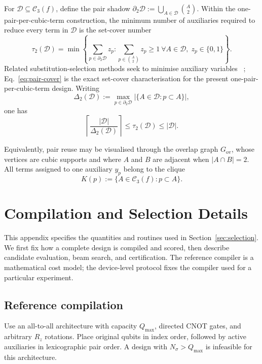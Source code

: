 \documentclass[a4paper,onecolumn,11pt,unpublished]{quantumarticle}
\theoremstyle{remark}
\begin{document}
For $\mathcal D\subseteq\mathcal C_3(f)$, define the pair shadow
\(
\partial_2\mathcal D
:=
\bigcup_{A\in\mathcal D}\binom{A}{2}.
\)
Within the one-pair-per-cubic-term construction, the minimum number of
auxiliaries required to reduce every term in $\mathcal D$ is the set-cover
number
\begin{equation}
\tau_2(\mathcal D)
=
\min
\left\{
\sum_{p\in\partial_2\mathcal D}z_p:
\sum_{p\in\binom{A}{2}}z_p\ge1\ \forall A\in\mathcal D,\;
z_p\in\{0,1\}
\right\}.
\label{eq:pair-cover}
\end{equation}
Related substitution-selection methods seek to minimise auxiliary variables
~\cite{VermaLewis2020,VermaLewisKochenberger2021,Schmidbauer2026};
Eq.~\eqref{eq:pair-cover} is the exact set-cover characterisation for the
present one-pair-per-cubic-term design.
Writing
\[
\Delta_2(\mathcal D)
:=
\max_{p\in\partial_2\mathcal D}
|\{A\in\mathcal D:p\subset A\}|,
\]
one has
\[
\left\lceil
\frac{|\mathcal D|}{\Delta_2(\mathcal D)}
\right\rceil
\le
\tau_2(\mathcal D)
\le
|\mathcal D|.
\]

Equivalently, pair reuse may be visualised through the overlap graph
$G_{\mathrm{ov}}$, whose vertices are cubic supports and where
$A$ and $B$ are adjacent when $|A\cap B|=2$. All terms assigned to one
auxiliary $y_p$ belong to the clique
\[
K(p):=\{A\in\mathcal C_3(f):p\subset A\}.
\]
\section{Compilation and Selection Details}
\label{app:certified-selection}

This appendix specifies the quantities and routines used in Section~\ref{sec:selection}.
We first fix how a complete design is compiled and scored, then describe
candidate evaluation, beam search, and certification.  The reference compiler
is a mathematical cost model; the device-level protocol fixes the compiler
used for a particular experiment.

\subsection{Reference compilation}
\label{app:reference-compiler}

Use an all-to-all architecture with capacity $Q_{\max}$, directed CNOT gates,
and arbitrary $R_z$ rotations.  Place original qubits in index order, followed
by active auxiliaries in lexicographic pair order.  A design with
$N_\sigma>Q_{\max}$ is infeasible for this architecture.
\end{document}
